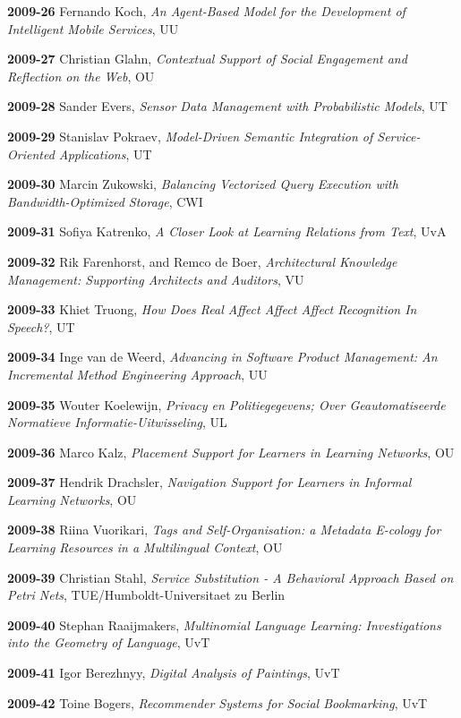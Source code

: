\begin{multicols}{2}
\textbf{2009-26}   Fernando Koch, \textit{An Agent-Based Model for the Development of Intelligent Mobile Services}, UU

\textbf{2009-27}   Christian Glahn, \textit{Contextual Support of Social Engagement and Reflection on the Web}, OU

\textbf{2009-28}   Sander Evers, \textit{Sensor Data Management with Probabilistic Models}, UT

\textbf{2009-29}   Stanislav Pokraev, \textit{Model-Driven Semantic Integration of Service-Oriented Applications}, UT

\textbf{2009-30}   Marcin Zukowski, \textit{Balancing Vectorized Query Execution with Bandwidth-Optimized Storage}, CWI

\textbf{2009-31}   Sofiya Katrenko, \textit{A Closer Look at Learning Relations from Text}, UvA

\textbf{2009-32}   Rik Farenhorst, and Remco de Boer, \textit{Architectural Knowledge Management: Supporting Architects and Auditors}, VU

\textbf{2009-33}   Khiet Truong, \textit{How Does Real Affect Affect Affect Recognition In Speech?}, UT

\textbf{2009-34}   Inge van de Weerd, \textit{Advancing in Software Product Management: An Incremental Method Engineering Approach}, UU

\textbf{2009-35}   Wouter Koelewijn, \textit{Privacy en Politiegegevens; Over Geautomatiseerde Normatieve Informatie-Uitwisseling}, UL

\textbf{2009-36}   Marco Kalz, \textit{Placement Support for Learners in Learning Networks}, OU

\textbf{2009-37}   Hendrik Drachsler, \textit{Navigation Support for Learners in Informal Learning Networks}, OU

\textbf{2009-38}   Riina Vuorikari, \textit{Tags and Self-Organisation: a Metadata E-cology for Learning Resources in a Multilingual Context}, OU

\textbf{2009-39}   Christian Stahl, \textit{Service Substitution - A Behavioral Approach Based on Petri Nets}, TUE/Humboldt-Universitaet zu Berlin

\textbf{2009-40}   Stephan Raaijmakers, \textit{Multinomial Language Learning: Investigations into the Geometry of Language}, UvT

\textbf{2009-41}   Igor Berezhnyy, \textit{Digital Analysis of Paintings}, UvT

\textbf{2009-42}   Toine Bogers,  \textit{Recommender Systems for Social Bookmarking}, UvT


\end{multicols}
